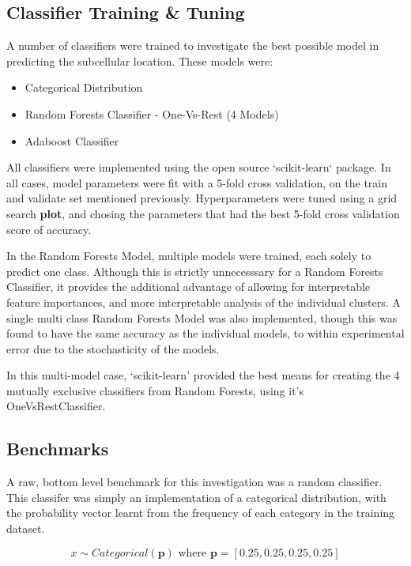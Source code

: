 \documentclass{bioinfo}
\begin{document}
\subsection{Classifier Training \& Tuning}

A number of classifiers were trained to investigate the best possible model in predicting the subcellular location. These models were:

\begin{itemize}
  \item {Categorical Distribution}
  \item {Random Forests Classifier - One-Vs-Rest (4 Models)}
  \item {Adaboost Classifier}
\end{itemize}

All classifiers were implemented using the open source `scikit-learn` package. In all cases, model parameters were fit with a 5-fold cross validation, on the train and validate set mentioned previously. Hyperparameters were tuned using a grid search \textbf{plot}, and chosing the parameters that had the best 5-fold cross validation score of accuracy. 

In the Random Forests Model, multiple models were trained, each solely to predict one class. Although this is strictly unnecesssary for a Random Forests Classifier, it provides the additional advantage of allowing for interpretable feature importances, and more interpretable analysis of the individual clusters. A single multi class Random Forests Model was also implemented, though this was found to have the same accuracy as the individual models, to within experimental error due to the stochasticity of the models.

In this multi-model case, `scikit-learn' provided the best means for creating the 4 mutually exclusive classifiers from Random Forests, using it's OneVsRestClassifier.

\subsection{Benchmarks}

A raw, bottom level benchmark for this investigation was a random classifier. This classifer was simply an implementation of a categorical distribution, with the probability vector learnt from the frequency of each category in the training dataset.

$$x \sim Categorical(\mathbf{p}) \text{ where } \mathbf{p} = [0.25, 0.25, 0.25, 0.25]$$
\end{document}
